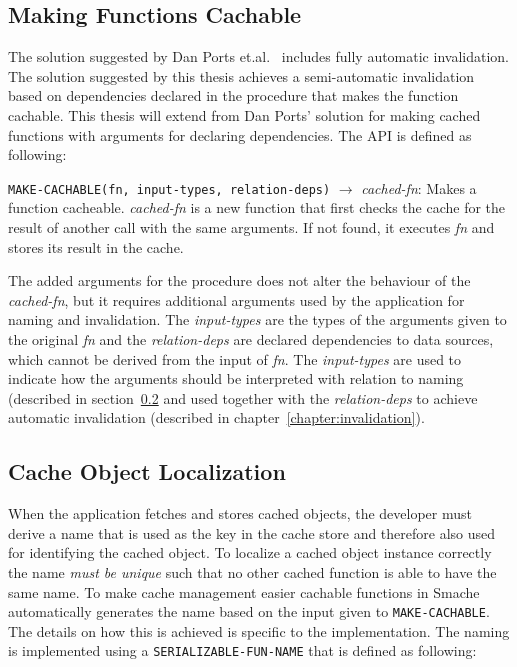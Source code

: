 
\subsection{Making Functions Cachable}
\label{subsec:making-functions-cachable}

The solution suggested by Dan Ports et.al.~\cite{paper:liskov} includes fully automatic invalidation. The solution suggested by this thesis achieves a semi-automatic invalidation based on dependencies declared in the procedure that makes the function cachable. This thesis will extend from Dan Ports' solution for making cached functions with arguments for declaring dependencies. The API is defined as following:

\verb$MAKE-CACHABLE(fn, input-types, relation-deps)$ $\rightarrow$ \emph{cached-fn}: Makes a function cacheable. \emph{cached-fn} is a new function that first checks the cache for the result of another call with the same arguments. If not found, it executes \emph{fn} and stores its result in the cache.

The added arguments for the procedure does not alter the behaviour of the \emph{cached-fn}, but it requires additional arguments used by the application for naming and invalidation. The \emph{input-types} are the types of the arguments given to the original \emph{fn} and the \emph{relation-deps} are declared dependencies to data sources, which cannot be derived from the input of \emph{fn}. The \emph{input-types} are used to indicate how the arguments should be interpreted with relation to naming (described in section~\ref{subsec:cache-object-localization} and used together with the \emph{relation-deps} to achieve automatic invalidation (described in chapter~\ref{chapter:invalidation}).


\subsection{Cache Object Localization}
\label{subsec:cache-object-localization}

When the application fetches and stores cached objects, the developer must derive a name that is used as the key in the cache store and therefore also used for identifying the cached object. To localize a cached object instance correctly the name \emph{must be unique} such that no other cached function is able to have the same name. To make cache management easier cachable functions in Smache automatically generates the name based on the input given to \verb$MAKE-CACHABLE$. The details on how this is achieved is specific to the implementation. The naming is implemented using a \verb$SERIALIZABLE-FUN-NAME$ that is defined as following:

